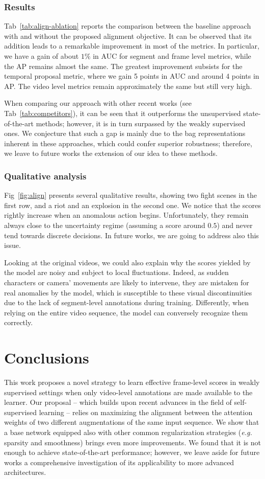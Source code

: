 \documentclass[runningheads]{llncs}
\begin{document}
\subsubsection{Results}
Tab~\ref{tab:align-ablation} reports the comparison between the baseline approach with and without the proposed alignment objective. It can be observed that its addition leads to a remarkable improvement in most of the metrics. In particular, we have a gain of about $1\%$ in AUC for segment and frame level metrics, while the AP remains almost the same. The greatest improvement subsists for the temporal proposal metric, where we gain 5 points in AUC and around 4 points in AP. The video level metrics remain approximately the same but still very high.

When comparing our approach with other recent works (see Tab~\ref{tab:competitors}), it can be seen that it outperforms the unsupervised state-of-the-art methods; however, it is in turn surpassed by the weakly supervised ones. We conjecture that such a gap is mainly due to the bag representations inherent in these approaches, which could confer superior robustness; therefore, we leave to future works the extension of our idea to these methods.
\subsubsection{Qualitative analysis} Fig~\ref{fig:align} presents several qualitative results, showing two fight scenes in the first row, and a riot and an explosion in the second one. We notice that the scores rightly increase when an anomalous action begins. Unfortunately, they remain always close to the uncertainty regime (assuming a score around $0.5$) and never tend towards discrete decisions. In future works, we are going to address also this issue.

Looking at the original videos, we could also explain why the scores yielded by the model are noisy and subject to local fluctuations. Indeed, as sudden characters or camera' movements are likely to intervene, they are mistaken for real anomalies by the model, which is susceptible to these visual discontinuities due to the lack of segment-level annotations during training. Differently, when relying on the entire video sequence, the model can conversely recognize them correctly. \section{Conclusions}
This work proposes a novel strategy to learn effective frame-level scores in weakly supervised settings when only video-level annotations are made available to the learner. Our proposal -- which builds upon recent advances in the field of self-supervised learning -- relies on maximizing the alignment between the attention weights of two different augmentations of the same input sequence. We show that a base network equipped also with other common regularization strategies (\textit{e.g.} sparsity and smoothness) brings even more improvements. We found that it is not enough to achieve state-of-the-art performance; however, we leave aside for future works a comprehensive investigation of its applicability to more advanced architectures.
\end{document}
